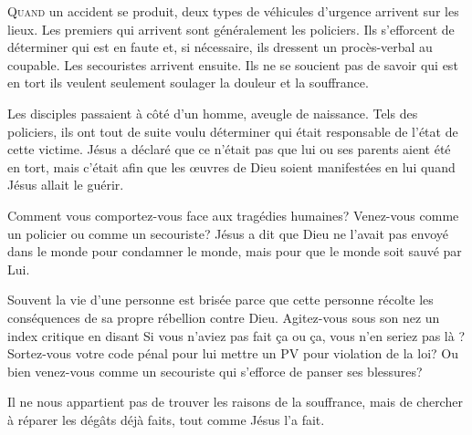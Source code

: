





\lettrine{Q}{uand} un accident se produit, deux types de véhicules
 d'urgence arrivent sur les lieux. Les premiers qui arrivent
 sont généralement les policiers. Ils s'efforcent de déterminer
 qui est en faute et, si nécessaire, ils dressent un procès-verbal
 au coupable. Les secouristes arrivent ensuite.
 Ils ne se 
 soucient pas de savoir qui est en tort
 \ocadr ils veulent seulement soulager la douleur et la souffrance.

Les disciples passaient à côté d'un homme, aveugle de naissance.
 Tels des policiers, ils ont tout de suite voulu déterminer
 qui était responsable de l'état de cette victime.
 Jésus a déclaré que ce n'était pas que lui ou ses parents aient été en tort,
 mais c'était afin que les \oe{}uvres de Dieu soient manifestées
 en lui quand Jésus allait le guérir.


Comment vous comportez-vous face aux tragédies humaines?
 Venez-vous comme un policier ou comme un secouriste?
 Jésus a dit que Dieu ne l'avait pas envoyé dans le monde
 pour condamner le monde, mais 
 pour que le monde soit sauvé par Lui.

Souvent la vie d'une personne est brisée parce que cette personne
 récolte les conséquences de sa propre rébellion contre Dieu.
 Agitez-vous sous son nez un index critique en disant\frcolon{} 
 \Og Si vous n'aviez pas fait \c{c}a ou \c{c}a, vous n'en seriez pas là \Fg{} ?
 Sortez-vous votre \Og code pénal \Fg{} pour lui mettre un PV
 pour violation de la loi? Ou bien venez-vous comme un secouriste
 qui s'efforce de panser ses blessures?

Il ne nous appartient pas de trouver les raisons de la souffrance,
 mais de chercher à réparer les dégâts déjà faits, tout comme Jésus l'a fait.

